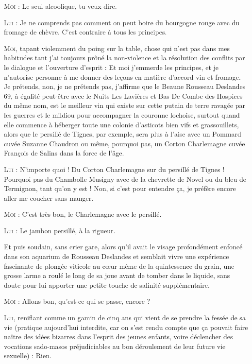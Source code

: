 \begin{dialogue}
\textsc{Moi} : Le seul alcoolique, tu veux dire.

\textsc{Lui} : Je ne comprends pas comment on peut boire du bourgogne rouge avec du fromage de chèvre. C’est contraire à tous les principes.

\textsc{Moi}, tapant violemment du poing sur la table, chose qui n’est pas dans mes habitudes tant j’ai toujours prôné la non-violence et la résolution des conflits par le dialogue et l’ouverture d’esprit : Et moi j’emmerde les principes, et je n’autorise personne à me donner des leçons en matière d’accord vin et fromage. Je prétends, non, je ne prétends pas, j’affirme que le Beaune Rousseau Deslandes 69, à égalité peut-être avec le Nuits Les Lavières et Bas De Combe des Hospices du même nom, est le meilleur vin qui existe sur cette putain de terre ravagée par les guerres et le mildiou pour accompagner la couronne lochoise, surtout quand elle commence à héberger toute une colonie d’asticots bien vifs et grassouillets, alors que le persillé de Tignes, par exemple, sera plus à l’aise avec un Pommard cuvée Suzanne Chaudron ou même, pourquoi pas, un Corton Charlemagne cuvée François de Salins dans la force de l’âge.

\textsc{Lui} : N’importe quoi ! Du Corton Charlemagne sur du persillé de Tignes ! Pourquoi pas du Chambolle Musigny avec de la chevrette de Novel ou du bleu de Termignon, tant qu’on y est ! Non, si c’est pour entendre ça, je préfère encore aller me coucher sans manger.

\textsc{Moi} : C’est très bon, le Charlemagne avec le persillé.

\textsc{Lui} : Le jambon persillé, à la rigueur.

\end{dialogue}

Et puis soudain, sans crier gare, alors qu’il avait le visage profondément enfoncé dans son aquarium de Rousseau Deslandes et semblait vivre une expérience fascinante de plongée viticole au cœur même de la quintessence du grain, une grosse larme a roulé le long de sa joue avant de tomber dans le liquide, sans doute pour lui apporter une petite touche de salinité supplémentaire.

\begin{dialogue}

\textsc{Moi} : Allons bon, qu’est-ce qui se passe, encore ?

\textsc{Lui}, reniflant comme un gamin de cinq ans qui vient de se prendre la fessée de sa vie (pratique aujourd’hui interdite, car on s’est rendu compte que ça pouvait faire naître des idées bizarres dans l’esprit des jeunes enfants, voire déclencher des vocations sado-masos préjudiciables au bon déroulement de leur future vie sexuelle) : Rien.

\end{dialogue}

